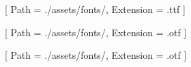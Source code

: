 \setmainfont{Times New Roman}

[
    Path = ./assets/fonts/,
    Extension = .ttf
]

[
    Path = ./assets/fonts/,
    Extension = .otf
]

[
    Path = ./assets/fonts/,
    Extension = .otf
]

\newcommand{\iconLightbulbOn}{{\far\char"F672}}
\newcommand{\iconMobile}{{\far\char"F3CE}}
\newcommand{\iconPenToSquare}{{\far\char"F044}}
\newcommand{\iconPersonRunningFast}{{\far\char"E5FF}}
\newcommand{\iconUserTie}{{\fas\char"F508}}
